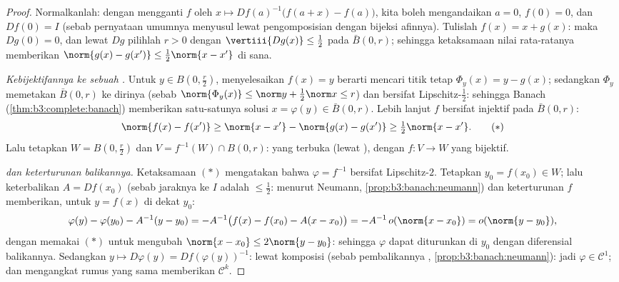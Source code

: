 \begin{proof}
Normalkanlah: dengan mengganti $f$ oleh $x \mapsto Df(a)^{-1}\bigl(f(a +
x) - f(a)\bigr)$, kita boleh mengandaikan $a = 0$, $f(0) = 0$, dan $Df(0) =
I$ (sebab pernyataan umumnya menyusul lewat pengomposisian dengan
bijeksi afinnya). Tulislah $f(x) = x + g(x)$: maka $Dg(0) = 0$, dan
lewat  $Dg$ pilihlah $r > 0$ dengan
$\vertiii{Dg(x)} \leq \frac12$ pada $\bar B(0, r)$; sehingga ketaksamaan
nilai rata-ratanya memberikan $\norm{g(x) - g(x')} \leq \frac12
\norm{x - x'}$ di sana.

\emph{Kebijektifannya ke sebuah .} Untuk $y \in B(0,
\frac r2)$, menyelesaikan $f(x) = y$ berarti mencari titik tetap
$\Phi_y(x) = y - g(x)$; sedangkan $\Phi_y$ memetakan $\bar B(0, r)$ ke
dirinya (sebab $\norm{\Phi_y(x)} \leq \norm y + \frac12\norm x \leq
r$) dan bersifat Lipschitz-$\frac12$: sehingga Banach
(\cref{thm:b3:complete:banach}) memberikan satu-satunya solusi
$x = \varphi(y) \in \bar B(0,r)$. Lebih lanjut $f$ bersifat injektif
pada $\bar B(0,r)$:
\[
\norm{f(x) - f(x')} \geq \norm{x - x'} - \norm{g(x) - g(x')}
\geq \tfrac12\norm{x - x'} .
\tag{$*$}
\]
Lalu tetapkan $W = B(0, \frac r2)$ dan $V = f^{-1}(W)\cap B(0, r)$:
yang terbuka (lewat ), dengan $f \colon V \to W$ yang bijektif.

\emph{ dan keterturunan balikannya.} Ketaksamaan $(*)$
mengatakan bahwa $\varphi = f^{-1}$ bersifat Lipschitz-$2$. Tetapkan $y_0 = f(x_0)
\in W$; lalu keterbalikan $A = Df(x_0)$ (sebab jaraknya ke $I$
adalah $\leq \frac12$: menurut Neumann,
\cref{prop:b3:banach:neumann}) dan keterturunan $f$
memberikan, untuk $y = f(x)$ di dekat $y_0$:
\[
\varphi(y) - \varphi(y_0) - A^{-1}(y - y_0)
= -A^{-1}\bigl(f(x) - f(x_0) - A(x - x_0)\bigr)
= -A^{-1}\,o(\norm{x - x_0}) = o(\norm{y - y_0}),
\]
dengan memakai $(*)$ untuk mengubah $\norm{x - x_0} \leq 2\norm{y - y_0}$:
sehingga $\varphi$ dapat diturunkan di $y_0$ dengan diferensial
balikannya. Sedangkan  $y \mapsto D\varphi(y) =
Df(\varphi(y))^{-1}$: lewat komposisi 
(sebab pembalikannya ,
\cref{prop:b3:banach:neumann}): jadi $\varphi \in \mathcal C^1$;
dan mengangkat rumus yang sama memberikan $\mathcal C^k$.
\end{proof}

